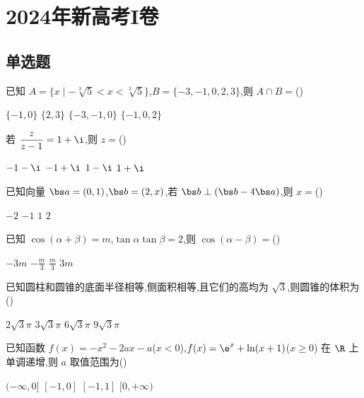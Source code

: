 
\chapter{2024年新高考I卷}

\section{单选题}

\begin{problem}
已知 \(A=\{x\mid -\sqrt[3]{5}<x<\sqrt[3]{5}\}\),\(B=\{-3,-1,0,2,3\}\),则 \(A\cap B=\)(\quad)

\choices
    {\(\{-1,0\}\)}
    {\(\{2,3\}\)}
    {\(\{-3,-1,0\}\)}
    {\(\{-1,0,2\}\)}
\end{problem}

\begin{problem}
若 \(\dfrac{z}{z-1}=1+\i\),则 \(z=\)(\quad)

\choices
    {\(-1-\i\)}
    {\(-1+\i\)}
    {\(1-\i\)}
    {\(1+\i\)}
\end{problem}

\begin{problem}
已知向量 \(\bs a=(0,1)\),\(\bs b=(2,x)\),若 \(\bs b\perp (\bs b-4\bs a)\),则 \(x=\)(\quad)

\choices
    {\(-2\)}
    {\(-1\)}
    {\(1\)}
    {\(2\)}
\end{problem}

\begin{problem}
已知 \(\cos(\alpha+\beta)=m\),\(\tan\alpha\tan\beta=2\),则 \(\cos(\alpha-\beta)=\)(\quad)

\choices
    {\(-3m\)}
    {\(-\frac{m}{3}\)}
    {\(\frac{m}{3}\)}
    {\(3m\)}
\end{problem}

\begin{problem}
已知圆柱和圆锥的底面半径相等,侧面积相等,且它们的高均为 \(\sqrt3\),则圆锥的体积为(\quad)

\choices
    {\(2\sqrt3\pi\)}
    {\(3\sqrt3\pi\)}
    {\(6\sqrt3\pi\)}
    {\(9\sqrt3\pi\)}
\end{problem}

\begin{problem}
已知函数
\(f(x)=-x^2-2ax-a\)(\(x<0\)),\(f(x)=\e^x+\ln(x+1)\)(\(x\ge 0\))
在 \(\R\) 上单调递增,则 \(a\) 取值范围为(\quad)

\choices
    {\((-\infty,0]\)}
    {\([-1,0]\)}
    {\([-1,1]\)}
    {\([0,+\infty)\)}
\end{problem}

